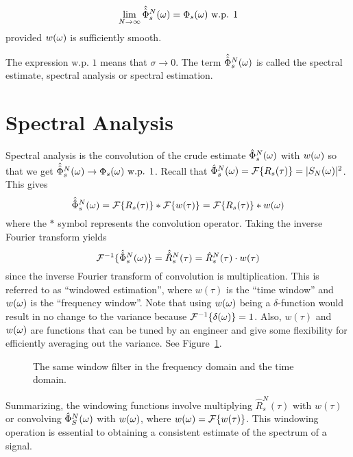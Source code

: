 \begin{theorem}
$$\lim_{N\to\infty}\hat{\hat{\Phi}}_s^N(\omega) = \Phi_s(\omega) \text{ w.p. } 1$$
provided $w(\omega)$ is sufficiently smooth.
\end{theorem}
The expression $\text{w.p. } 1$ means that $\sigma\to 0$.
The term $\hat{\hat{\Phi}}_s^N(\omega)$ is called the spectral estimate, spectral analysis or spectral estimation.

\section{Spectral Analysis}
Spectral analysis is the convolution of the crude estimate $\hat{\Phi}_s^N(\omega)$ with $w(\omega)$ so that we get $\hat{\hat{\Phi}}_s^N(\omega) \to \Phi_s(\omega) \text{ w.p. } 1$.
Recall that $\hat{\Phi}_s^N(\omega) = \mathcal{F}\{R_s(\tau)\} = |S_N(\omega)|^2$.
This gives
$$\hat{\hat{\Phi}}_s^N(\omega) = \mathcal{F}\{R_s(\tau)\} * \mathcal{F}\{w(\tau)\} = \mathcal{F}\{R_s(\tau)\} * w(\omega)$$
where the $*$ symbol represents the convolution operator.
Taking the inverse Fourier transform yields
$$\mathcal{F}^{-1}\{\hat{\hat{\Phi}}_s^N(\omega)\} = \hat{\hat{R}}_s^N(\tau) = \hat{R}_s^N(\tau)\cdot w(\tau)$$
since the inverse Fourier transform of convolution is multiplication.
This is referred to as ``windowed estimation'', where $w(\tau)$ is the ``time window'' and $w(\omega)$ is the ``frequency window''.
Note that using $w(\omega)$ being a $\delta$-function would result in no change to the variance because $\mathcal{F}^{-1}\{\delta(\omega)\} = 1$.
Also, $w(\tau)$ and $w(\omega)$ are functions that can be tuned by an engineer and give some flexibility for efficiently averaging out the variance.
See Figure~\ref{fig:06windowfilter}.

\begin{figure}[ht!]
\centering
{}
\hfill
{}
\hfill
\caption{The same window filter in the \protect{} frequency domain and the \protect{} time domain.}
\label{fig:06windowfilter}
\end{figure}

Summarizing, the windowing functions involve multiplying $\hat{R}_s^N(\tau)$ with $w(\tau)$ or convolving $\hat{\Phi}_S^N(\omega)$ with $w(\omega)$, where $w(\omega)=\mathcal{F}\{w(\tau)\}$.
This windowing operation is essential to obtaining a consistent estimate of the spectrum of a signal.

